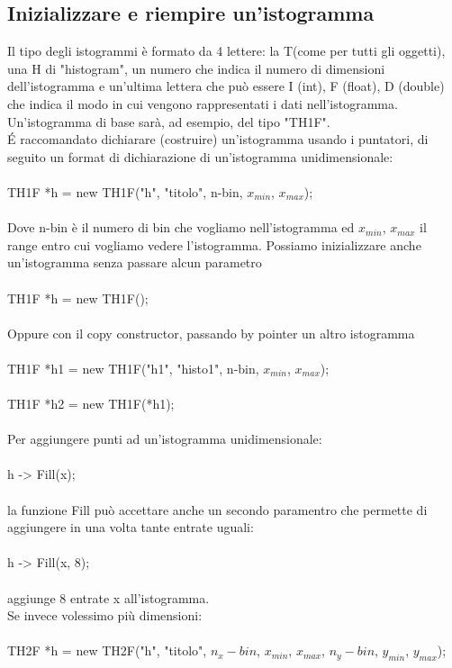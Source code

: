 \documentclass[10pt,a4paper]{article}
\begin{document}
\subsection{Inizializzare e riempire un'istogramma}
Il tipo degli istogrammi è formato da 4 lettere: la T(come per tutti gli oggetti), una H di "histogram", un numero che indica il numero di dimensioni dell'istogramma e un'ultima lettera che può essere I (int), F (float), D (double) che indica il modo in cui vengono rappresentati i dati nell'istogramma. Un'istogramma di base sarà, ad esempio, del tipo "TH1F".\\
\'{E} raccomandato dichiarare (costruire) un'istogramma usando i puntatori, di seguito un format di dichiarazione di un'istogramma unidimensionale:\\\\
TH1F *h = new TH1F("h", "titolo", n-bin, \(x_{min}\), \(x_{max}\)); \\\\
Dove n-bin è il numero di bin che vogliamo nell'istogramma ed \(x_{min}\), \(x_{max}\) il range entro cui vogliamo vedere l'istogramma. Possiamo inizializzare anche un'istogramma senza passare alcun parametro\\\\
TH1F *h = new TH1F(); \\\\
Oppure con il copy constructor, passando by pointer un altro istogramma\\\\
TH1F *h1 = new TH1F("h1", "histo1", n-bin, \(x_{min}\), \(x_{max}\));\\\\
TH1F *h2 =  new TH1F(*h1);\\\\
 Per aggiungere punti ad un'istogramma unidimensionale:\\\\
h -> Fill(x);\\\\
la funzione Fill può accettare anche un secondo paramentro che permette di aggiungere in una volta tante entrate uguali:\\\\
h -> Fill(x, 8);\\\\
aggiunge 8 entrate x all'istogramma.\\
Se invece volessimo più dimensioni:\\\\
TH2F *h = new TH2F("h", "titolo", \(n_x-bin\), \(x_{min}\), \(x_{max}\), \(n_y-bin\), \(y_{min}\), \(y_{max}\)); \\\\
\end{document}
